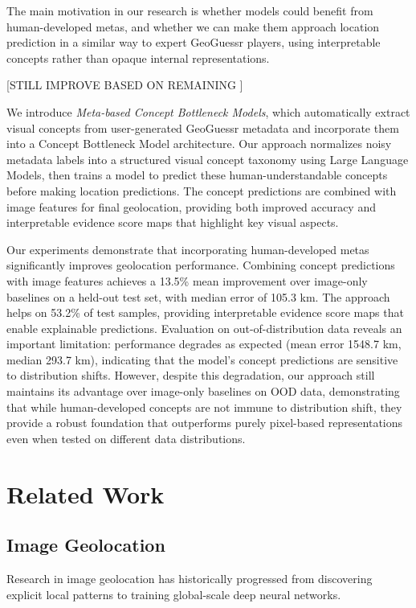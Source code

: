 \documentclass{article}
\begin{document}
The main motivation in our research is whether models could benefit from human-developed metas, and whether we can make them approach location prediction in a similar way to expert GeoGuessr players, using interpretable concepts rather than opaque internal representations.


[STILL IMPROVE BASED ON REMAINING ]


We introduce \textit{Meta-based Concept Bottleneck Models}, which automatically extract visual concepts from user-generated GeoGuessr metadata and incorporate them into a Concept Bottleneck Model architecture. Our approach normalizes noisy metadata labels into a structured visual concept taxonomy using Large Language Models, then trains a model to predict these human-understandable concepts before making location predictions. The concept predictions are combined with image features for final geolocation, providing both improved accuracy and interpretable evidence score maps that highlight key visual aspects.

Our experiments demonstrate that incorporating human-developed metas significantly improves geolocation performance. Combining concept predictions with image features achieves a 13.5\% mean improvement over image-only baselines on a held-out test set, with median error of 105.3 km. The approach helps on 53.2\% of test samples, providing interpretable evidence score maps that enable explainable predictions. Evaluation on out-of-distribution data reveals an important limitation: performance degrades as expected (mean error 1548.7 km, median 293.7 km), indicating that the model's concept predictions are sensitive to distribution shifts. However, despite this degradation, our approach still maintains its advantage over image-only baselines on OOD data, demonstrating that while human-developed concepts are not immune to distribution shift, they provide a robust foundation that outperforms purely pixel-based representations even when tested on different data distributions.

\section{Related Work}

\subsection{Image Geolocation}
Research in image geolocation has historically progressed from discovering explicit local patterns to training global-scale deep neural networks. 
\end{document}
